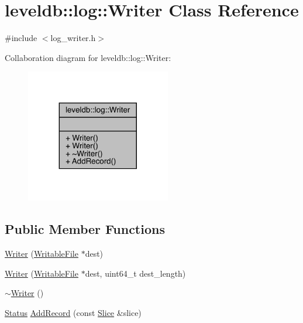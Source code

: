 \hypertarget{classleveldb_1_1log_1_1_writer}{}\section{leveldb\+::log\+::Writer Class Reference}
\label{classleveldb_1_1log_1_1_writer}


{\ttfamily \#include $<$log\+\_\+writer.\+h$>$}



Collaboration diagram for leveldb\+::log\+::Writer\+:
\nopagebreak
\begin{figure}[H]
\begin{center}
\leavevmode
\includegraphics[width=179pt]{classleveldb_1_1log_1_1_writer__coll__graph}
\end{center}
\end{figure}
\subsection*{Public Member Functions}
\begin{DoxyCompactItemize}
\item 
\mbox{\hyperlink{classleveldb_1_1log_1_1_writer_a424f67be4485fdf3ef8ba55c9c559c90}{Writer}} (\mbox{\hyperlink{classleveldb_1_1_writable_file}{Writable\+File}} $\ast$dest)
\item 
\mbox{\hyperlink{classleveldb_1_1log_1_1_writer_ad0460b6358412b6609899a821065c628}{Writer}} (\mbox{\hyperlink{classleveldb_1_1_writable_file}{Writable\+File}} $\ast$dest, uint64\+\_\+t dest\+\_\+length)
\item 
\mbox{\hyperlink{classleveldb_1_1log_1_1_writer_a71bcdee2a87eb535fd60a3fe047e66be}{$\sim$\+Writer}} ()
\item 
\mbox{\hyperlink{classleveldb_1_1_status}{Status}} \mbox{\hyperlink{classleveldb_1_1log_1_1_writer_acb4abda5a5348ac1771657ff01bf2fad}{Add\+Record}} (const \mbox{\hyperlink{classleveldb_1_1_slice}{Slice}} \&slice)
\end{DoxyCompactItemize}


